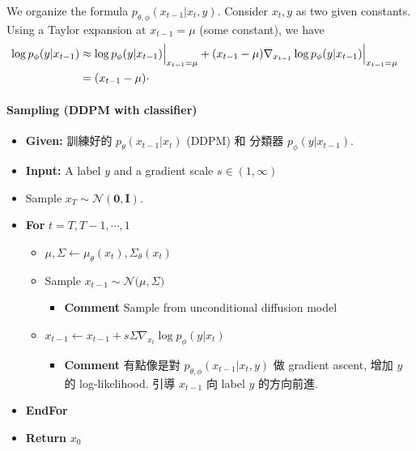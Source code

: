 \documentclass[
]{article}
\let\oldparagraph\paragraph
\renewcommand{\paragraph}[1]{\oldparagraph{#1}\mbox{}}
\providecommand{\tightlist}{%
  \setlength{\itemsep}{0pt}\setlength{\parskip}{0pt}}\usepackage{longtable,booktabs,array}
\theoremstyle{remark}
\begin{document}
\begin{itemize}
\begin{itemize}
    We organize the formula \(p_{\theta,\phi}(x_{t-1}\vert x_t,y).\)
    Consider \(x_t, y\) as two given constants. Using a Taylor expansion
    at \(x_{t-1}=\mu\) (some constant), we have \[
    \begin{aligned}
      \log p_{\phi}(y\vert x_{t-1}) 
      &\approx  \log p_{\phi}(y\vert x_{t-1})\Big\vert_{x_{t-1}=\mu} + (x_{t-1}-\mu) \nabla_{x_{t-1}} \log p_{\phi}(y\vert x_{t-1})\Big\vert_{x_{t-1}=\mu} \cr
      &= (x_{t-1}-\mu) \cdot 
    \end{aligned}
    \]
  \end{itemize}
\end{itemize}

\paragraph{Sampling (DDPM with
classifier)}\label{sampling-ddpm-with-classifier}

\begin{itemize}
\tightlist
\item
  \textbf{Given:} 訓練好的 \(p_{\theta}(x_{t-1}\vert x_t)\) (DDPM) 和
  分類器 \(p_{\phi}(y\vert x_{t-1}).\)
\item
  \textbf{Input:} A label \(y\) and a gradient scale \(s\in (1,\infty)\)
\item
  Sample \(x_T\sim \mathcal{N}(\mathbf{0},\mathbf{I}).\)
\item
  \textbf{For} \(t=T,T-1,\cdots,1\)

  \begin{itemize}
  \tightlist
  \item
    \(\mu,\Sigma \leftarrow \mu_{\theta}(x_t), \Sigma_{\theta}(x_t)\)
  \item
    Sample \(x_{t-1}\sim \mathcal{N}\bigl( \mu , \Sigma \bigr)\)

    \begin{itemize}
    \tightlist
    \item
      \textbf{Comment} Sample from unconditional diffusion model
    \end{itemize}
  \item
    \(x_{t-1}\leftarrow x_{t-1} + s \Sigma \nabla_{x_t} \log p_{\phi} (y\vert x_t)\)

    \begin{itemize}
    \item
      \textbf{Comment} 有點像是對
      \(p_{\theta,\phi}(x_{t-1}\vert x_t,y)\) 做 gradient ascent, 增加
      \(y\) 的 log-likelihood. 引導 \(x_{t-1}\) 向 label \(y\)
      的方向前進.
    \end{itemize}
  \end{itemize}
\item
  \textbf{EndFor}
\item
  \textbf{Return} \(x_0\)
\end{itemize}
\end{document}
